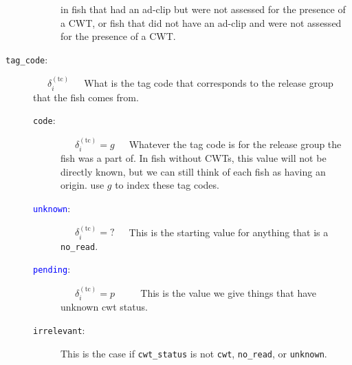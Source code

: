 \documentclass[11pt]{article}
\begin{document}
\begin{description}
\begin{description}
		in fish that had an ad-clip but were not assessed for the presence of a CWT, or fish that did not have
		an ad-clip and were not assessed for the presence of a CWT.
	\end{description}
	\item [{\tt tag\_code}:] ~~~$\delta_i^{(\mathrm{tc})}$~~~What is the tag code that corresponds to the release group that the fish comes from.
	\begin{description}
		\item [{\tt code}:] ~~~$\delta_i^{(\mathrm{tc})} = g$~~~Whatever the tag code is for the release group the fish was a part of.  In fish without CWTs, this value will not be directly known, but we can still think of each
		fish as having an origin.
		use $g$ to index these tag codes.
		\item [\textcolor{blue}{{\tt unknown}}:] ~~~$\delta_i^{(\mathrm{tc})} = \mbox{?}$~~~This is the starting value
		for anything that is a {\tt no\_read}.
		\item [\textcolor{blue}{{\tt pending}}:] ~~~$\delta_i^{(\mathrm{tc})} = p$ ~~~~ This is the value we give things
		that have unknown cwt status.  
		\item [{\tt irrelevant}:] This is the case if {\tt cwt\_status} is not {\tt cwt}, {\tt no\_read}, or {\tt unknown}.  
	\end{description}
\end{description}
\end{document}
